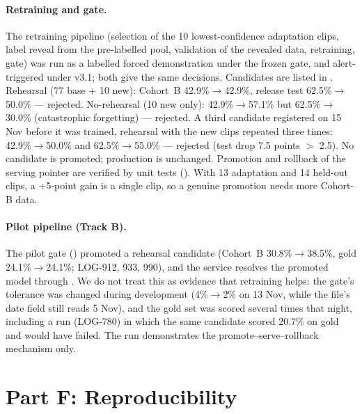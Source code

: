 \documentclass[sigconf,authordraft]{acmart}
\begin{document}
\paragraph{Retraining and gate.}
The retraining pipeline (selection of the 10 lowest-confidence adaptation clips, label reveal from the pre-labelled pool, validation of the revealed data, retraining, gate) was run as a labelled forced demonstration under the frozen gate, and alert-triggered under v3.1; both give the same decisions. Candidates are listed in . Rehearsal (77 base + 10 new): Cohort~B 42.9\%$\to$42.9\%, release test 62.5\%$\to$50.0\% --- rejected. No-rehearsal (10 new only): 42.9\%$\to$57.1\% but 62.5\%$\to$30.0\% (catastrophic forgetting) --- rejected. A third candidate registered on 15 Nov before it was trained, rehearsal with the new clips repeated three times: 42.9\%$\to$50.0\% and 62.5\%$\to$55.0\% --- rejected (test drop 7.5 points $>$ 2.5). No candidate is promoted; production is unchanged. Promotion and rollback of the serving pointer are verified by unit tests (). With 13 adaptation and 14 held-out clips, a +5-point gain is a single clip, so a genuine promotion needs more Cohort-B data.
\paragraph{Pilot pipeline (Track B).}
The pilot gate () promoted a rehearsal candidate (Cohort~B 30.8\%$\to$38.5\%, gold 24.1\%$\to$24.1\%;  LOG-912, 933, 990), and the service resolves the promoted model through . We do not treat this as evidence that retraining helps: the gate's tolerance was changed during development (4\%$\to$2\% on 13 Nov, while the file's date field still reads 5 Nov), and the gold set was scored several times that night, including a run (LOG-780) in which the same candidate scored 20.7\% on gold and would have failed. The run demonstrates the promote--serve--rollback mechanism only.

\section{Part F: Reproducibility}\label{sec:repro}
\end{document}
